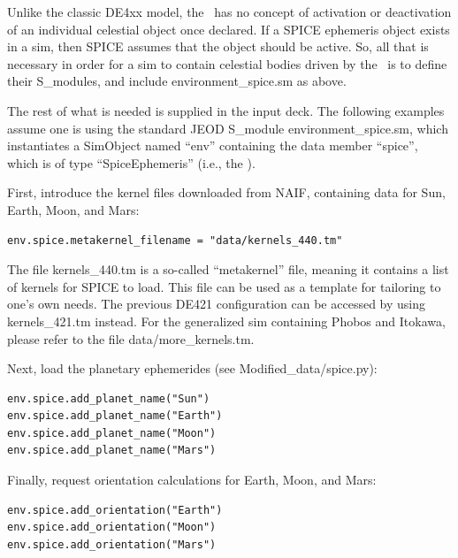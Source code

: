 Unlike the classic DE4xx model, the \SpiceDesc\ has no concept of activation
or deactivation of an individual celestial object once declared.  If a
SPICE ephemeris object exists in a sim, then SPICE assumes that the object
should be active.  So, all that is necessary in order for a sim to contain
celestial bodies driven by the \SpiceDesc\ is to define their S\_modules,
and include environment\_spice.sm as above.

The rest of what is needed is supplied in the input deck. The following
examples assume one is using the standard JEOD S\_module environment\_spice.sm,
which instantiates a SimObject named ``env'' containing the data member
``spice'', which is of type ``SpiceEphemeris'' (i.e., the \SpiceDesc).

First, introduce the kernel files downloaded from NAIF, containing data
for Sun, Earth, Moon, and Mars:
\begin{verbatim}
env.spice.metakernel_filename = "data/kernels_440.tm"
\end{verbatim}
The file kernels\_440.tm is a so-called ``metakernel'' file, meaning it contains
a list of kernels for SPICE to load. This file can be used as a template for
tailoring to one's own needs. The previous DE421 configuration can be accessed
by using kernels\_421.tm instead. For the generalized sim containing Phobos and
Itokawa, please refer to the file data/more\_kernels.tm.

Next, load the planetary ephemerides (see Modified\_data/spice.py):
\begin{verbatim}
env.spice.add_planet_name("Sun")
env.spice.add_planet_name("Earth")
env.spice.add_planet_name("Moon")
env.spice.add_planet_name("Mars")
\end{verbatim}

Finally, request orientation calculations for Earth, Moon, and Mars:
\begin{verbatim}
env.spice.add_orientation("Earth")
env.spice.add_orientation("Moon")
env.spice.add_orientation("Mars")
\end{verbatim}

